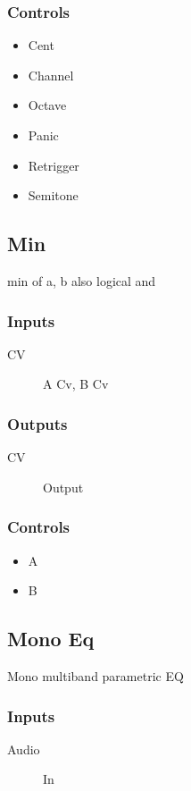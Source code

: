\subsubsection{Controls}
\begin{itemize}
\item Cent
\item Channel
\item Octave
\item Panic
\item Retrigger
\item Semitone
\end{itemize}

\subsection{Min}

min of a, b also logical and



\subsubsection{Inputs}
\begin{description}
\item [CV] A Cv, B Cv
\end{description}

\subsubsection{Outputs}
\begin{description}
\item [CV] Output
\end{description}

\subsubsection{Controls}
\begin{itemize}
\item A
\item B
\end{itemize}

\subsection{Mono Eq}

Mono multiband parametric EQ



\subsubsection{Inputs}
\begin{description}
\item [Audio] In
\end{description}

